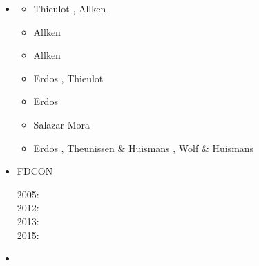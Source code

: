 \begin{itemize}
\item \fantom {}

\begin{scriptsize}
\begin{itemize}
\item[\twothousandeleven]   Thieulot \cite{thie11}, Allken \etal \cite{alht11}
\item[\twothousandtwelve]   Allken \etal \cite{alht12}
\item[\twothousandthirteen] Allken \etal \cite{alhf13}
\item[\twothousandfourteen] Erdos \etal \cite{erhv14}, Thieulot \etal \cite{thsh14}
\item[\twothousandfifteen]  Erdos \etal \cite{erhv15}
\item[\twothousandeighteen] Salazar-Mora \etal \cite{sahf18}
\item[\twothousandnineteen] Erdos \etal \cite{erhv19}, Theunissen \& Huismans \cite{thhu19}, 
                            Wolf \& Huismans \cite{wohu19}
\end{itemize}
\end{scriptsize}

\item FDCON 

\begin{scriptsize}
2005: \cite{enbs05}\\
2012: \cite{crsg12}\\
2013: \cite{fusc13}\\
2015: \cite{fuks15}
\end{scriptsize}

\item \fluidity {}


\end{itemize}
